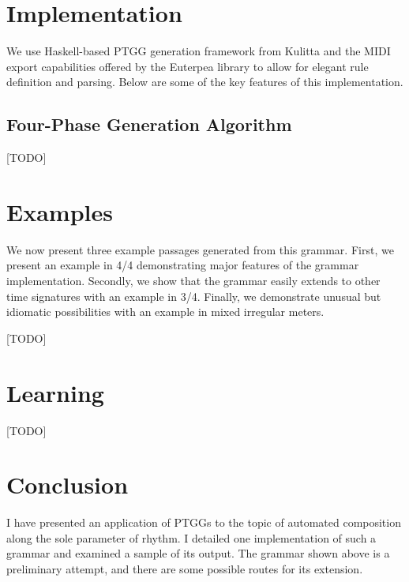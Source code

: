 \documentclass{article}
\begin{document}

\section{Implementation}

We use Haskell-based PTGG generation framework from Kulitta and the MIDI export capabilities offered by the Euterpea library \cite{euterpea} to allow for elegant rule definition and parsing. Below are some of the key features of this implementation.

\subsection{Four-Phase Generation Algorithm}

[TODO]


\section{Examples}

We now present three example passages generated from this grammar. First, we present an example in 4/4 demonstrating major features of the grammar implementation. Secondly, we show that the grammar easily extends to other time signatures with an example in 3/4. Finally, we demonstrate unusual but idiomatic possibilities with an example in mixed irregular meters.

[TODO]


\section{Learning}

[TODO]


\section{Conclusion}

I have presented an application of PTGGs to the topic of automated composition along the sole parameter of rhythm. I detailed one implementation of such a grammar and examined a sample of its output. The grammar shown above is a preliminary attempt, and there are some possible routes for its extension. 
\end{document}
